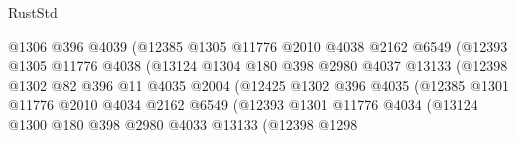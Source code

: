 \begin{lexlean}{RustStd}
\begin{coremodule}
                                    @1306
                                    @396
                                    @4039
                                    (@12385
                                      @1305
                                      @11776
                                      @2010
                                      @4038
                                      @2162
                                      @6549
                                      (@12393
                                        @1305
                                        @11776
                                        @4038
                                        (@13124
                                          @1304
                                          @180
                                          @398
                                          @2980
                                          @4037
                                          @13133
                                          (@12398
                                            @1302
                                            @82
                                            @396
                                            @11
                                            @4035
                                            @2004
                                            (@12425
                                              @1302
                                              @396
                                              @4035
                                              (@12385
                                                @1301
                                                @11776
                                                @2010
                                                @4034
                                                @2162
                                                @6549
                                                (@12393
                                                  @1301
                                                  @11776
                                                  @4034
                                                  (@13124
                                                    @1300
                                                    @180
                                                    @398
                                                    @2980
                                                    @4033
                                                    @13133
                                                    (@12398
                                                      @1298

\end{coremodule}
\end{lexlean}
